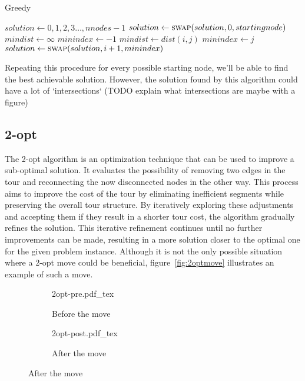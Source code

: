 \documentclass{article}
\begin{document}
\begin{algorithm}[h]
\caption{Greedy}
\label{alg:greedy}
\begin{algorithmic}

	\State $solution \gets {0, 1, 2, 3 \dots, nnodes - 1}$
	\State $solution \gets \Call{swap}{solution, 0, startingnode}$
		\State $mindist \gets \infty$
		\State $minindex \gets -1$
				\State $mindist \gets dist(i, j)$
				\State $minindex \gets j$
			\EndIf
		\EndFor
		\State $solution \gets \Call{swap}{solution, i + 1, minindex}$
    \EndFor

  \EndProcedure

\end{algorithmic}
\end{algorithm}
Repeating this procedure for every possible starting node, we'll be able to find the best
achievable solution.
However, the solution found by this algorithm could have a lot of `intersections`
(TODO explain what intersections are maybe with a figure)

\subsection{2-opt}
The 2-opt algorithm is an optimization technique that can be used to improve a sub-optimal solution.
It evaluates the possibility of removing two edges in the tour and reconnecting the now disconnected nodes in the other way.
This process aims to improve the cost of the tour by eliminating inefficient segments while preserving the overall tour structure. By
iteratively exploring these adjustments and accepting them if they result in a shorter tour cost, the algorithm gradually refines
the solution. This iterative refinement continues until no further improvements can be made, resulting in a more
solution closer to the optimal one for the given problem instance.
Although it is not the only possible situation where a 2-opt move could be
beneficial, figure~\ref{fig:2optmove} illustrates an example of such a move.

\begin{figure}[H]
        \caption{Example of a 2-opt move}
        \label{fig:2optmove}
        \centering
        \begin{subfigure}{.5\textwidth}
                \centering
                \def\svgwidth{.7\linewidth}
                {2opt-pre.pdf_tex}
                \caption{Before the move}
        \end{subfigure}%
        \begin{subfigure}{.5\textwidth}
                \centering
                \def\svgwidth{.7\linewidth}
                {2opt-post.pdf_tex}
                \caption{After the move}
        \end{subfigure}
\end{figure}
\end{document}
